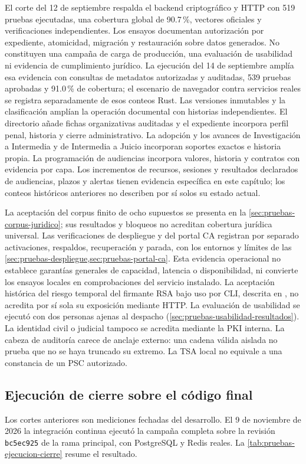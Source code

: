 El corte del 12 de septiembre respalda el backend criptográfico y HTTP con 519 pruebas ejecutadas, una cobertura global de 90.7\,\%, vectores oficiales y verificaciones independientes. Los ensayos documentan autorización por expediente, atomicidad, migración y restauración sobre datos generados. No constituyen una campaña de carga de producción, una evaluación de usabilidad ni evidencia de cumplimiento jurídico. La ejecución del 14 de septiembre amplía esa evidencia con consultas de metadatos autorizadas y auditadas, 539 pruebas aprobadas y 91.0\,\% de cobertura; el escenario de navegador contra servicios reales se registra separadamente de esos conteos Rust. Las versiones inmutables y la clasificación amplían la operación documental con historias independientes. El directorio añade fichas organizativas auditadas y el expediente incorpora perfil penal, historia y cierre administrativo. La adopción y los avances de Investigación a Intermedia y de Intermedia a Juicio incorporan soportes exactos e historia propia. La programación de audiencias incorpora valores, historia y contratos con evidencia por capa. Los incrementos de recursos, sesiones y resultados declarados de audiencias, plazos y alertas tienen evidencia específica en este capítulo; los conteos históricos anteriores no describen por sí solos su estado actual.

La aceptación del corpus finito de ocho supuestos se presenta en la \cref{sec:pruebas-corpus-juridico}; sus resultados y bloqueos no acreditan cobertura jurídica universal. Las verificaciones de despliegue y del portal CA registran por separado activaciones, respaldos, recuperación y parada, con los entornos y límites de las \cref{sec:pruebas-despliegue,sec:pruebas-portal-ca}. Esta evidencia operacional no establece garantías generales de capacidad, latencia o disponibilidad, ni convierte los ensayos locales en comprobaciones del servicio instalado. La aceptación histórica del riesgo temporal del firmante RSA bajo uso por CLI, descrita en , no acredita por sí sola su exposición mediante HTTP. La evaluación de usabilidad se ejecutó con dos personas ajenas al despacho (\cref{sec:pruebas-usabilidad-resultados}). La identidad civil o judicial tampoco se acredita mediante la PKI interna. La cabeza de auditoría carece de anclaje externo: una cadena válida aislada no prueba que no se haya truncado su extremo. La TSA local no equivale a una constancia de un PSC autorizado.

\subsection{Ejecución de cierre sobre el código final}\label{sec:pruebas-ejecucion-cierre}
Los cortes anteriores son mediciones fechadas del desarrollo. El 9 de noviembre
de 2026 la integración continua ejecutó la campaña completa sobre la revisión
\texttt{bc5ec925} de la rama principal, con PostgreSQL y Redis reales. La
\cref{tab:pruebas-ejecucion-cierre} resume el resultado.

